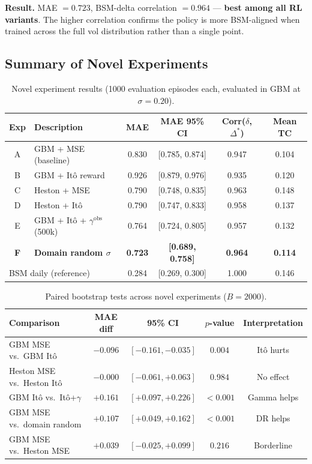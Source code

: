 \documentclass[12pt,a4paper]{article}
\begin{document}
\textbf{Result.}  MAE $= 0.723$, BSM-delta correlation $= 0.964$ ---
\textbf{best among all RL variants}.  The higher correlation confirms the
policy is more BSM-aligned when trained across the full vol distribution
rather than a single point.

\subsection{Summary of Novel Experiments}

\begin{table}[H]
  \centering
  \caption{Novel experiment results (1000 evaluation episodes each, evaluated
           in GBM at $\sigma=0.20$).}
  \label{tab:novel}
  \begin{tabular}{clcccc}
    \toprule
    Exp & Description & MAE & MAE 95\% CI & Corr($\delta$, $\Delta^*$) & Mean TC \\
    \midrule
    A & GBM + MSE (baseline) & 0.830 & [0.785, 0.874] & 0.947 & 0.104 \\
    B & GBM + It\^{o} reward & 0.926 & [0.879, 0.976] & 0.935 & 0.120 \\
    C & Heston + MSE         & 0.790 & [0.748, 0.835] & 0.963 & 0.148 \\
    D & Heston + It\^{o}     & 0.790 & [0.747, 0.833] & 0.958 & 0.137 \\
    E & GBM + It\^{o} + $\gamma^{\mathrm{obs}}$ (500k) & 0.764 & [0.724, 0.805] & 0.957 & 0.132 \\
    \textbf{F} & \textbf{Domain random $\sigma$} & \textbf{0.723} & \textbf{[0.689, 0.758]} & \textbf{0.964} & \textbf{0.114} \\
    \midrule
    \multicolumn{2}{l}{BSM daily (reference)} & 0.284 & [0.269, 0.300] & 1.000 & 0.146 \\
    \bottomrule
  \end{tabular}
\end{table}

\begin{table}[H]
  \centering
  \caption{Paired bootstrap tests across novel experiments ($B=2000$).}
  \label{tab:novel_boot}
  \begin{tabular}{lcccc}
    \toprule
    Comparison & MAE diff & 95\% CI & $p$-value & Interpretation \\
    \midrule
    GBM MSE vs.\ GBM It\^{o}        & $-0.096$ & $[-0.161,-0.035]$ & $0.004$  & Itô hurts \\
    Heston MSE vs.\ Heston It\^{o}  & $-0.000$ & $[-0.061,+0.063]$ & $0.984$  & No effect \\
    GBM It\^{o} vs.\ It\^{o}+$\gamma$ & $+0.161$ & $[+0.097,+0.226]$ & $<0.001$ & Gamma helps \\
    GBM MSE vs.\ domain random      & $+0.107$ & $[+0.049,+0.162]$ & $<0.001$ & DR helps \\
    GBM MSE vs.\ Heston MSE         & $+0.039$ & $[-0.025,+0.099]$ & $0.216$  & Borderline \\
    \bottomrule
  \end{tabular}
\end{table}
\end{document}
